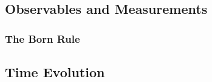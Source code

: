 \subsection{Observables and Measurements}


\subsubsection{The Born Rule}

















\subsection{Time Evolution}

